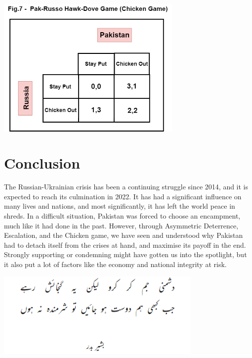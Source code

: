 \documentclass[runningheads]{llncs}
\begin{document}
\begin{center}
    \includegraphics[width=9cm]{russo-pak-chicken.png}
\end{center}

\section{Conclusion}

The Russian-Ukrainian crisis has been a continuing struggle since 2014, and it is expected to reach its culmination in 2022. It has had a significant influence on many lives and nations, and most significantly, it has left the world peace in shreds. In a difficult situation, Pakistan was forced to choose an encampment, much like it had done in the past. However, through Asymmetric Deterrence, Escalation, and the Chicken game, we have seen and understood why Pakistan had to detach itself from the crises at hand, and maximise its payoff in the end. Strongly supporting or condemning might have gotten us into the spotlight, but it also put a lot of factors like the economy and national integrity at risk.

\begin{center}
    \includegraphics[width=10cm]{sher.png}
\end{center}
\end{document}
